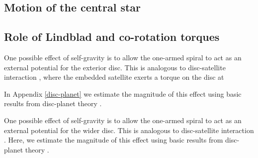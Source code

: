 {\bf
  \subsection{Motion of the central star} 
  
  \subsection{Role of Lindblad and co-rotation torques}
  One possible effect of self-gravity is to allow the one-armed spiral  
  to act as an external potential for the exterior disc. This is
  analogous to disc-satellite interaction 
  \citep{goldreich79}, where the embedded satellite exerts a torque on
  the disc at 



In Appendix \ref{disc-planet} we estimate the magnitude of this effect
  using basic results from disc-planet theory \citep[see, e.g.][and
  references therein]{papaloizou07}.  
  

One possible effect of self-gravity is to allow the one-armed spiral  
to act as an external potential for the wider disc. This is
analogous to disc-satellite interaction 
\citep{goldreich79}. Here, we estimate the magnitude of this effect
using basic results from disc-planet theory \citep[see, e.g.][and
references therein]{papaloizou07}.  

}




























